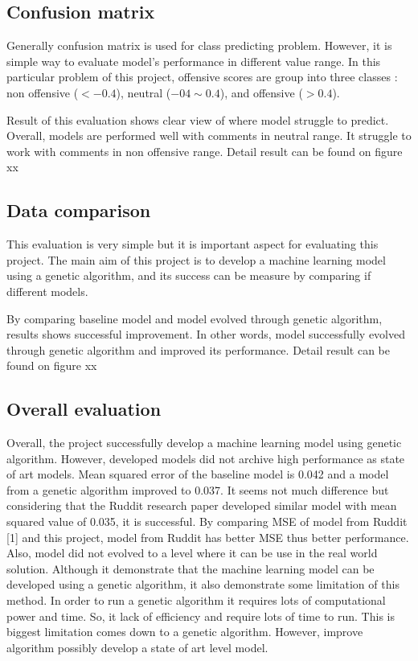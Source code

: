\documentclass[11pt, natbib=false]{article}
\begin{document}
\subsection{Confusion matrix}
Generally confusion matrix is used for class predicting problem. However, it is simple way to evaluate model’s performance in different value range. In this particular problem of this project, offensive scores are group into three classes : non offensive ($ < -0.4$), neutral ($-04 \sim 0.4$), and offensive ($ > 0.4$).

Result of this evaluation shows clear view of where model struggle to predict. Overall, models are performed well with comments in neutral range. It struggle to work with comments in non offensive range.
Detail result can be found on figure xx

\subsection{Data comparison}
This evaluation is very simple but it is important aspect for evaluating this project. The main aim of this project is to develop a machine learning model using a genetic algorithm, and its success can be measure by comparing if different models.

By comparing baseline model and model evolved through genetic algorithm, results shows successful improvement. In other words, model successfully evolved through genetic algorithm and improved its performance.
Detail result can be found on figure xx

\subsection{Overall evaluation}
Overall, the project successfully develop a machine learning model using genetic algorithm. However, developed models did not archive high performance as state of art models. Mean squared error of the baseline model is 0.042 and a model from a genetic algorithm improved to 0.037. It seems not much difference but considering that the Ruddit research paper developed similar model with mean squared value of 0.035, it is successful.
By comparing MSE of model from Ruddit [1] and this project, model from Ruddit has better MSE thus better performance. Also, model did not evolved to a level where it can be use in the real world solution. Although it demonstrate that the machine learning model can be developed using a genetic algorithm, it also demonstrate some limitation of this method. In order to run a genetic algorithm it requires lots of computational power and time. So, it lack of efficiency and require lots of time to run. This is biggest limitation comes down to a genetic algorithm. However, improve algorithm possibly develop a state of art level model. 
\end{document}
